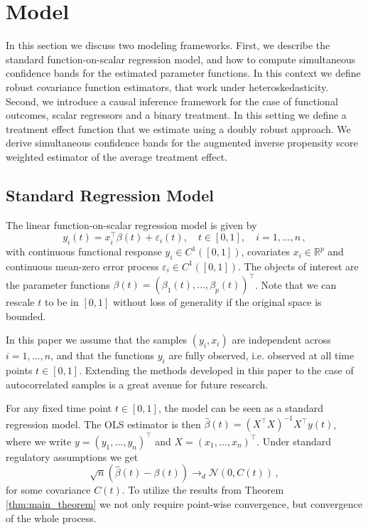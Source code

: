 \section{Model}

In this section we discuss two modeling frameworks. First, we describe the standard
function-on-scalar regression model, and how to compute simultaneous confidence bands
for the estimated parameter functions. In this context we define robust covariance
function estimators, that work under heteroskedasticity. Second, we introduce a causal
inference framework for the case of functional outcomes, scalar regressors and a binary
treatment. In this setting we define a treatment effect function that we estimate using
a doubly robust approach. We derive simultaneous confidence bands for the augmented
inverse propensity score weighted estimator of the average treatment effect.

\subsection{Standard Regression Model}

The linear function-on-scalar regression model is given by
\[
    y_i(t) = x_i^\top \beta(t) + \varepsilon_i(t), \quad t \in [0, 1], \quad i =
    1,\dots,n \,,
\]
with continuous functional response $y_i \in C^1([0, 1])$, covariates $x_i \in
\mathbb{R}^p$ and continuous mean-zero error process $\varepsilon_i \in C^1([0, 1])$.
The objects of interest are the parameter functions $\beta(t) = (\beta_1(t), \dots,
\beta_p(t))^\top$.  Note that we can rescale $t$ to be in $[0, 1]$ without loss of
generality if the original space is bounded.

In this paper we assume that the samples $(y_i, x_i)$ are independent across $i =
1,\dots, n$, and that the functions $y_i$ are fully observed, i.e.  observed at all time
points $t \in [0, 1]$. Extending the methods developed in this paper to the case of
autocorrelated samples is a great avenue for future research.

For any fixed time point $t \in [0, 1]$, the model can be seen as a standard regression
model. The OLS estimator is then $\hat{\beta}(t) = (X^\top X)^{-1}X^\top y(t)$, where we
write $y = (y_1, \dots, y_n)^\top$ and $X = (x_1, \dots, x_n)^\top$. Under standard
regulatory assumptions we get
\[
    \sqrt{n}(\hat{\beta}(t) - \beta(t)) \to_d \mathcal{N}(0, C(t)) \,,
\]
for some covariance $C(t)$. To utilize the results from Theorem \ref{thm:main_theorem}
we not only require point-wise convergence, but convergence of the whole process.

